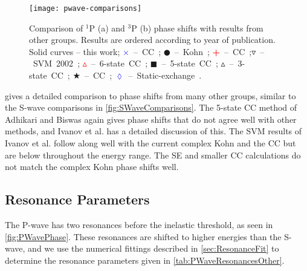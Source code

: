 \documentclass[Dissertation.tex]{subfiles}
\begin{document}
\begin{figure}
	\centering
	\texttt{[image: pwave-comparisons]}
	\caption[Comparison of P-wave phase shifts]{Comparison of $^1$P (a) and $^3$P (b) phase shifts with results from other groups. Results are ordered according to year of publication. Solid curves -- this work; \mbox{\textcolor{blue}{$\times$} -- CC \cite{Walters2004};} \mbox{$\CIRCLE$ -- Kohn \cite{VanReeth2003};} \mbox{\textcolor{red}{\textbf{+}} -- CC \cite{Blackwood2002};}\mbox{$\triangledown$ -- SVM 2002 \cite{Ivanov2002};} \mbox{\textcolor{red}{$\vartriangle$} -- 6-state CC \cite{Sinha2000};} \mbox{$\blacksquare$ -- 5-state CC \cite{Adhikari1999};} \mbox{$\vartriangle$ -- 3-state CC \cite{Sinha1997};} \mbox{\textcolor[RGB]{0,127,0}{$\bigstar$} -- CC \cite{Ray1997};} \mbox{\textcolor{blue}{$\lozenge$} -- Static-exchange \cite{Hara1975}.}}
	\label{fig:PWaveComparisons}
\end{figure}


 gives a detailed comparison to phase shifts from 
many other groups, similar to the S-wave comparisons in
\cref{fig:SWaveComparisons}. The 5-state CC method of Adhikari and Biswas
\cite{Adhikari1999} again gives phase shifts that do not agree well with other 
methods, and Ivanov et al. \cite{Ivanov2002} has a detailed discussion of 
this. The SVM results of Ivanov et al. \cite{Ivanov2002} follow along well 
with the current complex Kohn and the CC \cite{Blackwood2002,Walters2004} but 
are below throughout the energy range. The SE
\cite{Hara1975,Ray1997} and smaller CC calculations \cite{Sinha1997} do not
match the complex Kohn phase shifts well.


\subsection{Resonance Parameters}
\label{sec:PWaveResonances}

The P-wave has two 
resonances before the inelastic threshold, as seen in \cref{fig:PWavePhase}. 
These resonances are shifted to higher energies than the
S-wave, and we use the numerical fittings described in \cref{sec:ResonanceFit}
to determine the resonance parameters given in \cref{tab:PWaveResonancesOther}.
\end{document}
